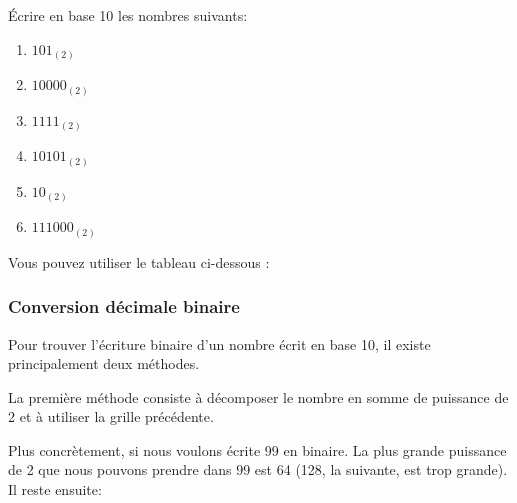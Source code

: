 \documentclass[11pt, a4paper]{book}
\begin{document}
\begin{exercice}
\'Ecrire en base 10 les nombres suivants:
\begin{multicols}{2}
\begin{enumerate}
\item $101_{(2)}$ 
\item $10 000_{(2)}$
\item $1111_{(2)}$
\item $10101_{(2)}$
\item $10_{(2)}$
\item $111 000_{(2)}$

\end{enumerate}
\end{multicols}

Vous pouvez utiliser le tableau ci-dessous : 

\begin{center}
\end{center} 

\end{exercice}

\subsubsection{Conversion décimale binaire}

Pour trouver l'écriture binaire d'un nombre écrit en base 10, il existe principalement deux méthodes. 


\; 

La première méthode consiste à décomposer le nombre en somme de puissance de 2 et à utiliser la grille précédente. 

Plus concrètement, si nous voulons écrite 99 en binaire. La plus grande puissance de 2 que nous pouvons prendre dans 99 est 64 (128, la suivante, est trop grande). Il reste ensuite: 
\end{document}

